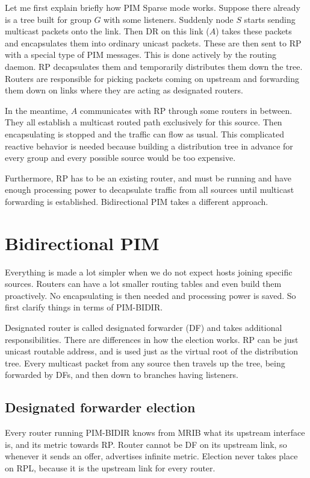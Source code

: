 Let me first explain briefly how PIM Sparse mode works. Suppose there already
is a tree built for group $G$ with some listeners. Suddenly node $S$ starts
sending multicast packets onto the link. Then DR on this link ($A$) takes these
packets and encapsulates them into ordinary unicast packets. These are then
sent to RP with a special type of PIM messages. This is done actively by the
routing daemon. RP decapsulates them and temporarily distributes them down the
tree. Routers are responsible for picking packets coming on upstream and
forwarding them down on links where they are acting as designated routers.

In the meantime, $A$ communicates with RP through some routers in between. They
all establish a multicast routed path exclusively for this source. Then
encapsulating is stopped and the traffic can flow as usual. This complicated
reactive behavior is needed because building a distribution tree in advance
for every group and every possible source would be too expensive.

Furthermore, RP has to be an existing router, and must be running and have
enough processing power to decapsulate traffic from all sources until
multicast forwarding is established. Bidirectional PIM takes a different
approach.

\section{Bidirectional PIM}

Everything is made a lot simpler when we do not expect hosts joining specific
sources. Routers can have a lot smaller routing tables and even build them
proactively. No encapsulating is then needed and processing power is saved. So
first clarify things in terms of PIM-BIDIR.

Designated router is called designated forwarder (DF) and takes additional
responsibilities. There are differences in how the election works. RP can be
just unicast routable address, and is used just as the virtual root of the
distribution tree. Every multicast packet from any source then travels up the
tree, being forwarded by DFs, and then down to branches having listeners.

\subsection{Designated forwarder election}

Every router running PIM-BIDIR knows from MRIB what its upstream interface is,
and its metric towards RP. Router cannot be DF on its upstream link, so
whenever it sends an offer, advertises infinite metric. Election never takes place
on RPL, because it is the upstream link for every router.

